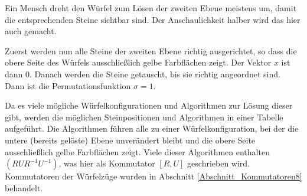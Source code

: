 \documentclass[12pt,a4paper, usenames, dvipsnames]{article}
\theoremstyle{mystyle}
\theoremstyle{definition}
\begin{document}
Ein Mensch dreht den Würfel zum Lösen der zweiten Ebene meistens um, damit die entsprechenden Steine sichtbar sind. Der Anschaulichkeit halber wird das hier auch gemacht.

Zuerst werden nun alle Steine der zweiten Ebene richtig ausgerichtet, so dass die obere Seite des Würfels ausschließlich gelbe Farbflächen zeigt. Der Vektor $x$ ist dann $0$. Danach werden die Steine getauscht, bis sie richtig angeordnet sind. Dann ist die Permutationsfunktion $\sigma = 1$.

Da es viele mögliche Würfelkonfigurationen und Algorithmen zur Lösung dieser gibt, werden die möglichen Steinpositionen und Algorithmen in einer Tabelle aufgeführt. Die Algorithmen führen alle zu einer Würfelkonfiguration, bei der die untere (bereits gelöste) Ebene unverändert bleibt und die obere Seite ausschließlich gelbe Farbflächen zeigt.
Viele dieser Algorithmen enthalten $(R U R^{-1} U^{-1})$, was hier als Kommutator $[ R,U ]$ geschrieben wird. Kommutatoren der Würfelzüge wurden in Abschnitt \ref{Abschnitt_Kommutatoren8} behandelt.
\end{document}
